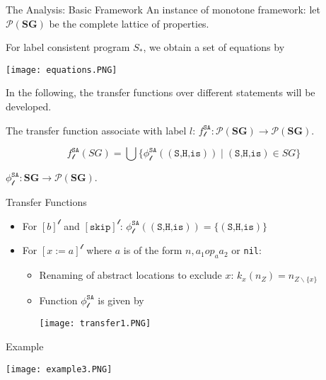 \documentclass[aspectratio=1610, 13pt]{beamer}
\begin{document}
\begin{frame}{The Analysis: Basic Framework}
    An instance of monotone framework: let $\mathcal{P}(\mathbf{SG})$ be the complete lattice of properties.
    
    For label consistent program $S_*$, we obtain a set of equations by
    \begin{center}
        \texttt{[image: equations.PNG]}
    \end{center}
    
    In the following, the transfer functions over different statements will be developed.
    
    The transfer function associate with label $l$: $f_{\mathcal{l}}^{\texttt{SA}}: \mathcal{P}(\mathbf{SG})\rightarrow\mathcal{P}(\mathbf{SG})$.
    
    \[f_{\mathcal{l}}^{\texttt{SA}}(SG) = \bigcup\{\phi_{\mathcal{l}}^{\texttt{SA}}((\texttt{S,H,is}))\mid (\texttt{S,H,is}) \in SG\}\]
    
    $\phi_{\mathcal{l}}^{\texttt{SA}}: \mathbf{SG} \rightarrow \mathcal{P}(\mathbf{SG})$.
\end{frame}
\begin{frame}{Transfer Functions}
\begin{itemize}
    \item 
    For $[b]^{\mathcal{l}}$ and $[\texttt{skip}]^{\mathcal{l}}$: $\phi_{\mathcal{l}}^{\texttt{SA}}((\texttt{S,H,is})) = \{(\texttt{S,H,is})\}$ 
    \item For $[x := a]^{\mathcal{l}}$ where $a$ is of the form $n, a_1 op_a a_2$ or \texttt{nil}:
    \begin{itemize}
        \item Renaming of abstract locations to exclude $x$: $k_x(n_Z) = n_{Z\backslash\{ x\}}$
        \item Function $\phi_{\mathcal{l}}^\texttt{SA}$ is given by
    \begin{center}
        \texttt{[image: transfer1.PNG]}
    \end{center}
    \end{itemize}
\end{itemize}
\end{frame}

\begin{frame}{Example}
    
    \begin{center}
        \texttt{[image: example3.PNG]}
    \end{center}
\end{frame}
\end{document}
